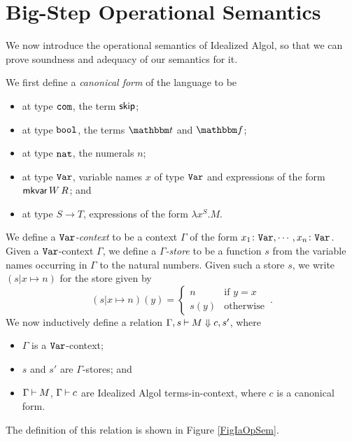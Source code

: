 \documentclass[11pt]{report}
\begin{document}
\section{Big-Step Operational Semantics}

We now introduce the operational semantics of Idealized Algol, so that we can prove soundness and adequacy of our semantics for it.

We first define a \emph{canonical form} of the language to be
\begin{itemize}
  \item at type ${\mathtt{com}}$, the term ${\mathsf{skip}}$;
  \item at type ${\mathtt{bool}}$, the terms $\true$ and $\false$;
  \item at type ${\mathtt{nat}}$, the numerals $n$; 
  \item at type ${\mathtt{Var}}$, variable names $x$ of type ${\mathtt{Var}}$ and expressions of the form $\operatorname{{\mathsf{mkvar}}} W\,R$; and
  \item at type $S\to T$, expressions of the form $\lambda x^S.M$.
\end{itemize}

We define a \emph{${\mathtt{Var}}$-context} to be a context $\Gamma$ of the form $x_1\colon {\mathtt{Var}},\cdots,x_n\colon {\mathtt{Var}}$.
Given a ${\mathtt{Var}}$-context $\Gamma$, we define a \emph{$\Gamma$-store} to be a function $s$ from the variable names occurring in $\Gamma$ to the natural numbers.  
Given such a store $s$, we write $(s\vert x \mapsto n)$ for the store given by
\[
  (s\vert x\mapsto n)(y) = \begin{cases}
    n & \text{if $y = x$} \\
    s(y) & \text{otherwise}
  \end{cases}\,.
  \]
We now inductively define a relation $\Gamma,s\mathbin{\vdash} M\Downarrow c,s'$, where
\begin{itemize}
  \item $\Gamma$ is a ${\mathtt{Var}}$-context; 
  \item $s$ and $s'$ are $\Gamma$-stores;  and
  \item $\Gamma\mathbin{\vdash} M$, $\Gamma\mathbin{\vdash} c$ are Idealized Algol terms-in-context, where $c$ is a canonical form.
\end{itemize}
The definition of this relation is shown in Figure \ref{FigIaOpSem}.
\end{document}
